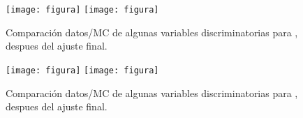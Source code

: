 \begin{figure}[!htbp]

  \centering

  \texttt{[image: figura]}
  \texttt{[image: figura]}

  \caption{Comparación datos/MC de algunas variables discriminatorias
    para {\SRL}, despues del ajuste final.}
  \label{fig:unblind_dist_2}

\end{figure}

\begin{figure}[!htbp]
  \centering

  \texttt{[image: figura]}
  \texttt{[image: figura]}

  \caption{Comparación datos/MC de algunas variables discriminatorias
    para {\SRH}, despues del ajuste final.}
  \label{fig:unblind_dist_3}

\end{figure}








